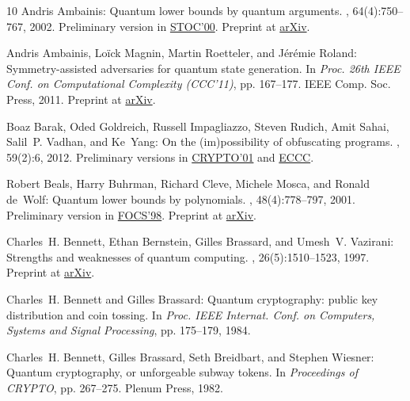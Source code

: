 \begin{thebibliography}{10}
{\sc Andris Ambainis}: Quantum lower bounds by quantum arguments.
, 64(4):750--767, 2002.
\newblock Preliminary version in
  \href{http://dx.doi.org/10.1145/335305.335394}{STOC'00}. Preprint at
  \href{http://arxiv.org/abs/quant-ph/0002066}{arXiv}.

{\sc Andris Ambainis, Lo\"{i}ck Magnin, Martin Roetteler, and J\'{e}r\'{e}mie
  Roland}: Symmetry-assisted adversaries for quantum state generation.
\newblock In {\em Proc. 26th IEEE Conf. on Computational Complexity (CCC'11)},
  pp. 167--177. IEEE Comp. Soc. Press, 2011.
\newblock Preprint at \href{http://arxiv.org/abs/1012.2112}{arXiv}.

{\sc Boaz Barak, Oded Goldreich, Russell Impagliazzo, Steven Rudich, Amit
  Sahai, Salil~P. Vadhan, and Ke~Yang}: On the (im)possibility of obfuscating
  programs.
, 59(2):6, 2012.
\newblock Preliminary versions in
  \href{http://dx.doi.org/10.1007/3-540-44647-8_1}{CRYPTO'01} and
  \href{http://eccc.hpi-web.de/report/2001/057/}{ECCC}.
\newblock [\epfmtdoi{10.1145/2160158.2160159}]

{\sc Robert Beals, Harry Buhrman, Richard Cleve, Michele Mosca, and Ronald
  de~Wolf}: Quantum lower bounds by polynomials.
, 48(4):778--797, 2001.
\newblock Preliminary version in
  \href{http://dx.doi.org/10.1109/SFCS.1998.743485}{FOCS'98}. Preprint at
  \href{http://arxiv.org/abs/quant-ph/9802049}{arXiv}.
\newblock [\epfmtdoi{10.1145/502090.502097}]

{\sc Charles~H. Bennett, Ethan Bernstein, Gilles Brassard, and Umesh~V.
  Vazirani}: Strengths and weaknesses of quantum computing.
, 26(5):1510--1523, 1997.
\newblock Preprint at \href{http://arxiv.org/abs/quant-ph/9701001}{arXiv}.
\newblock [\epfmtdoi{10.1137/S0097539796300933}]

{\sc Charles~H. Bennett and Gilles Brassard}: Quantum cryptography: public key
  distribution and coin tossing.
\newblock In {\em Proc. IEEE Internat. Conf. on Computers, Systems and Signal
  Processing}, pp. 175--179, 1984.

{\sc Charles~H. Bennett, Gilles Brassard, Seth Breidbart, and Stephen Wiesner}:
  Quantum cryptography, or unforgeable subway tokens.
\newblock In {\em Proceedings of CRYPTO}, pp. 267--275. Plenum Press, 1982.


\end{thebibliography}
